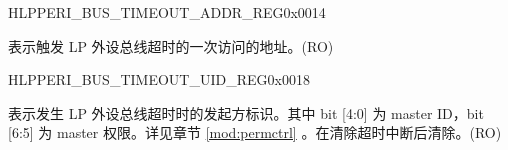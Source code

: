 \begin{register}{H}{LPPERI\_BUS\_TIMEOUT\_ADDR\_REG}{0x0014}\label{regdesc:LPPERIBUSTIMEOUTADDRREG}
%
\regnewline%
\begin{regdesc}\begin{reglist}
\label{fielddesc:LPPERILPPERITIMEOUTADDR}\item [LPPERI\_LP\_PERI\_TIMEOUT\_ADDR] 表示触发 LP 外设总线超时的一次访问的地址。(RO)
\end{reglist}\end{regdesc}
\end{register}


\begin{register}{H}{LPPERI\_BUS\_TIMEOUT\_UID\_REG}{0x0018}\label{regdesc:LPPERIBUSTIMEOUTUIDREG}
%
%
\regnewline%
\begin{regdesc}\begin{reglist}
\label{fielddesc:LPPERILPPERITIMEOUTUID}\item [LPPERI\_LP\_PERI\_TIMEOUT\_UID] 表示发生 LP 外设总线超时时的发起方标识。其中 bit [4:0] 为 master ID，bit [6:5] 为 master 权限。详见章节 \ref{mod:permctrl} \textit{}。在清除超时中断后清除。(RO)
\end{reglist}\end{regdesc}
\end{register}


